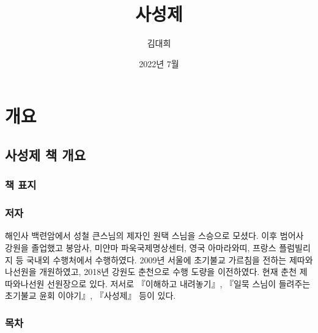 \documentclass[12pt, a4paper, oneside]{book}
\begin{document}
	
			\dominitoc
			

			\title{사성제}
			\author{김대희}
			\date{2022년 7월}
			\maketitle


			\tableofcontents
			\listoftables
			\listoffigures

			
	\part{개요}


	\newpage
	\chapter{사성제 책 개요}


		\newpage
		\minitoc				%

	\newpage  \null
	\section{책 표지}


	\newpage  \null
	\section{저자}

해인사 백련암에서 성철 큰스님의 제자인 원택 스님을 스승으로 모셨다. 
이후 범어사 강원을 졸업했고 봉암사, 미얀마 파욱국제명상센터, 영국 아마라와띠, 프랑스 플럼빌리지 등 국내외 수행처에서 수행하였다. 
2009년 서울에 초기불교 가르침을 전하는 제따와나선원을 개원하였고, 2018년 강원도 춘천으로 수행 도량을 이전하였다. 
현재 춘천 제따와나선원 선원장으로 있다. 
저서로 『이해하고 내려놓기』, 『일묵 스님이 들려주는 초기불교 윤회 이야기』, 『사성제』 등이 있다.

	\newpage  \null
	\section{목차}
\end{document}

